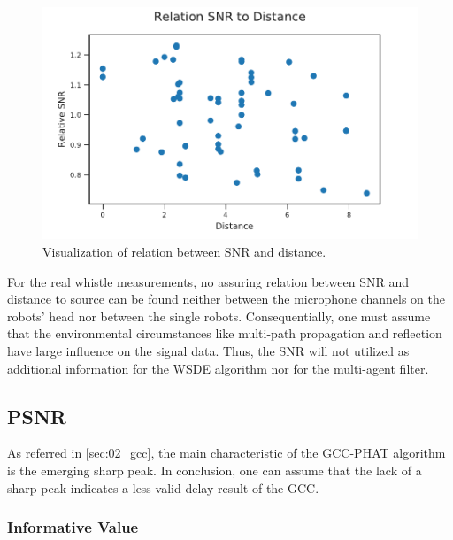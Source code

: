 \begin{figure}[h]
	\centering
	\includegraphics[]{figures/evaluation/snr_scatter}
	\caption{Visualization of relation between SNR and distance.}
	\label{fig:04_snrDistance}
\end{figure}

For the real whistle measurements, no assuring relation between \ac{SNR}
and distance to source can be found neither between the microphone
channels on the robots' head nor between the single robots.
Consequentially, one must assume that the environmental circumstances
like multi-path propagation and reflection have large influence
on the signal data.
Thus, the \ac{SNR} will not utilized as additional information
for the \ac{WSDE} algorithm nor for the multi-agent filter.

\subsection{PSNR}
\label{subsec:04_psnr}

As referred in \cref{sec:02_gcc}, the main characteristic of the \ac{GCC-PHAT}
algorithm is the emerging sharp peak.
In conclusion, one can assume that the lack of a sharp peak indicates
a less valid delay result of the \ac{GCC}.

\subsubsection*{Informative Value}

